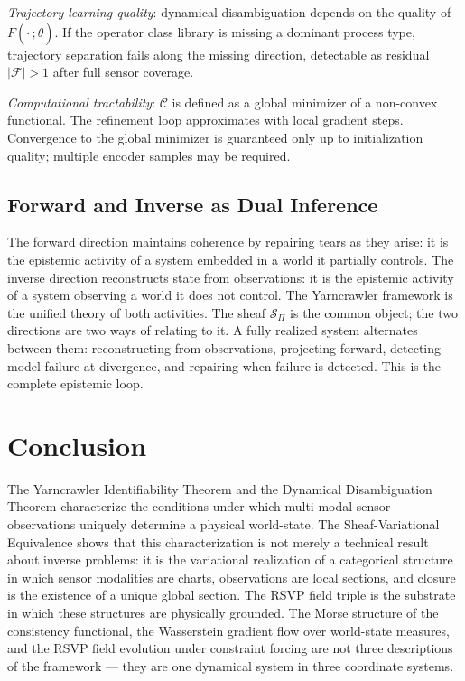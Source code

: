 \documentclass[11pt, oneside]{article}
\begin{document}
\emph{Trajectory learning quality}: dynamical disambiguation depends on the quality of
$F(\cdot\,;\hat{\theta})$. If the operator class library is missing a dominant process
type, trajectory separation fails along the missing direction, detectable as residual
$|\mathcal{F}| > 1$ after full sensor coverage.

\emph{Computational tractability}: $\mathcal{C}$ is defined as a global minimizer of a
non-convex functional. The refinement loop approximates with local gradient steps.
Convergence to the global minimizer is guaranteed only up to initialization quality;
multiple encoder samples may be required.

\subsection{Forward and Inverse as Dual Inference}

The forward direction maintains coherence by repairing tears as they arise: it is the
epistemic activity of a system embedded in a world it partially controls. The inverse
direction reconstructs state from observations: it is the epistemic activity of a system
observing a world it does not control. The Yarncrawler framework is the unified theory of
both activities. The sheaf $\mathcal{S}_\Pi$ is the common object; the two directions are
two ways of relating to it. A fully realized system alternates between them:
reconstructing from observations, projecting forward, detecting model failure at
divergence, and repairing when failure is detected. This is the complete epistemic loop.

\section{Conclusion}
\label{sec:conclusion}

The Yarncrawler Identifiability Theorem and the Dynamical Disambiguation Theorem
characterize the conditions under which multi-modal sensor observations uniquely determine
a physical world-state. The Sheaf-Variational Equivalence shows that this characterization
is not merely a technical result about inverse problems: it is the variational realization
of a categorical structure in which sensor modalities are charts, observations are local
sections, and closure is the existence of a unique global section. The RSVP field triple
is the substrate in which these structures are physically grounded. The Morse structure of
the consistency functional, the Wasserstein gradient flow over world-state measures, and
the RSVP field evolution under constraint forcing are not three descriptions of the
framework --- they are one dynamical system in three coordinate systems.
\end{document}
